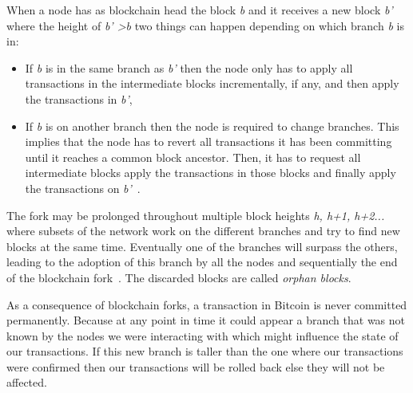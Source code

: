 When a node has as blockchain head the block \textit{b} and it receives a new block \textit{b'} where the height of \textit{b' \textgreater b} two things can happen depending on which branch \textit{b} is in:
\begin{itemize}
\item If \textit{b} is in the same branch as \textit{b'} then the node only has to apply all transactions in the intermediate blocks incrementally, if any, and then apply the transactions in \textit{b'},
\item If \textit{b} is on another branch then the node is required to change branches. This implies that the node has to revert all transactions it has been committing until it reaches a common block ancestor. Then, it has to request all intermediate blocks apply the transactions in those blocks and finally apply the transactions on \textit{b'}~\cite{decker2013information}.
\end{itemize}

The fork may be prolonged throughout multiple block heights \textit{h, h+1, h+2...} where subsets of the network work on the different branches and try to find new blocks at the same time. Eventually one of the branches will surpass the others, leading to the adoption of this branch by all the nodes and sequentially the end of the blockchain fork~\cite{decker2013information}. The discarded blocks are called \textit{orphan blocks}.

As a consequence of blockchain forks, a transaction in Bitcoin is never committed permanently. Because at any point in time it could appear a branch that was not known by the nodes we were interacting with which might influence the state of our transactions. If this new branch is taller than the one where our transactions were confirmed then our transactions will be rolled back else they will not be affected.




